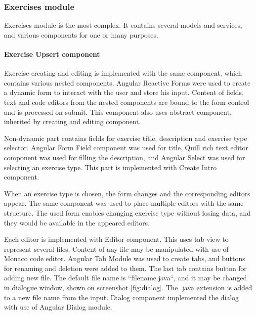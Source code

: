             \subsubsection{Exercises module}
            Exercises module is the most complex. It contains several models and services, and various components for one or many purposes.
        
                \paragraph{Exercise Upsert component}
                Exercise creating and editing is implemented with the same component, which contains various nested components. Angular Reactive Forms were used to create a dynamic form to interact with the user and store his input.  Content of fields, text and code editors from the nested components are bound to the form control and is processed on submit. This component also uses abstract component, inherited by creating and editing component.
                
                Non-dynamic part contains fields for exercise title, description and exercise type selector. Angular Form Field component was used for title, Quill rich text editor component was used for filling the description, and Angular Select was used for selecting an exercise type. This part is implemented with Create Intro component.
                
                When an exercise type is chosen, the form changes and the corresponding editors appear. The same component was used to place multiple editors with the same structure. The used form enables changing exercise type without losing data, and they would be available in the appeared editors.
                
                Each editor is implemented with Editor component. This uses tab view to represent several files. Content of any file may be manipulated with use of Monaco code editor. Angular Tab Module was used to create tabs, and buttons for renaming and deletion were added to them. The last tab contains button for adding new file. The default file name is ``filename.java``, and it may be changed in dialogue window, shown on screenshot \ref{fig:dialog}. The .java extension is added to a new file name from the input. Dialog component implemented the dialog with use of Angular Dialog module.
                
